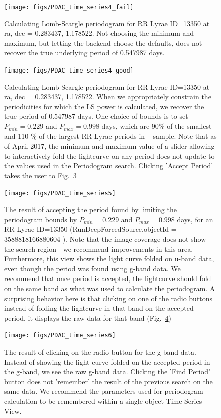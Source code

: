 \documentclass[DM,lsstdraft,toc,usenatbib]{lsstdoc}
\begin{document}
\begin{figure}
\texttt{[image: figs/PDAC\_time\_series4\_fail]}
\caption{Calculating Lomb-Scargle periodogram for RR Lyrae ID=13350  at  ra, dec = 0.283437\degree, 1.178522\degree . Not choosing the minimum and maximum, but letting the backend choose the defaults, does not recover the true underlying period of 0.547987 days. }
\label{fig:time_series4f}
\end{figure}


\begin{figure}
\texttt{[image: figs/PDAC\_time\_series4\_good]}
\caption{Calculating Lomb-Scargle periodogram for RR Lyrae ID=13350  at  ra, dec = 0.283437\degree, 1.178522\degree . When we appropriately constrain the periodicities for which the LS power is calculated, we recover the true period of  0.547987 days.  One choice of bounds is to  set $P_{min} =  0.229 $ and $P_{max} = 0.998$ days, which are 90\% of the smallest and 110 \% of the largest RR Lyrae periods in ~\citep{sesar2010} sample. Note that as of April 2017, the minimum and maximum value of a slider allowing to interactively fold the lightcurve on any period does not update to the values used in the Periodogram search. Clicking 'Accept Period' takes the user to Fig.~\ref{fig:time_series5}}
\label{fig:time_series4g}
\end{figure}



\begin{figure}
\texttt{[image: figs/PDAC\_time\_series5]}
\caption{The result of accepting the period found by limiting the periodogram bounds by $P_{min} =  0.229 $ and $P_{max} = 0.998$ days, for an RR Lyrae ID=13350 (RunDeepForcedSource.objectId = 3588818166880604 ). Note that the image coverage does not show the search region - we recommend improvements in this area. Furthermore, this view shows the light curve folded on u-band data, even though  the period was found using g-band data. We recommend that once period is accepted, the lightcurve should fold on the same band as what was used to calculate the periodogram. A surprising behavior here is that clicking on one of the radio buttons instead of folding the lightcurve in that band  on the accepted period, it displays the raw data for that band (Fig.~\ref{fig:time_series6})  }
\label{fig:time_series5}
\end{figure}


\begin{figure}
\texttt{[image: figs/PDAC\_time\_series6]}
\caption{The result of clicking on the radio button for the g-band data. Instead of showing the light curve folded on the accepted period in the g-band, we see the raw g-band data. Clicking the 'Find Period' button does not 'remember' the result of the previous search on the same data. We recommend the parameters used for  periodogram calculation to be remembered within a single object Time Series View.  }
\label{fig:time_series6}
\end{figure}
\end{document}
